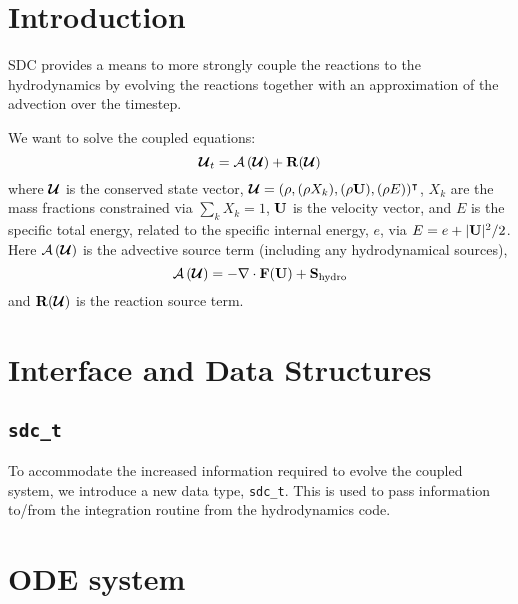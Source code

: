 \section{Introduction}

SDC provides a means to more strongly couple the reactions to the
hydrodynamics by evolving the reactions together with an approximation
of the advection over the timestep.

We want to solve the coupled equations:
\begin{equation}
{\bm{\mathcal{U}}}_t = {\mathcal{A} \left({\bm{\mathcal{U}}}\right)} + {\bf R}({\bm{\mathcal{U}}})
\end{equation}
where ${\bm{\mathcal{U}}}$ is the conserved state vector, ${\bm{\mathcal{U}}} = (\rho, (\rho X_k),
(\rho {\bf U}), (\rho E))^\intercal$, $X_k$ are the mass fractions
constrained via $\sum_k X_k = 1$, ${\bf U}$ is the velocity vector, and
$E$ is the specific total energy, related to the specific internal
energy, $e$, via $E = e + |{\bf U}|^2/2$.  Here ${\mathcal{A} \left({\bm{\mathcal{U}}}\right)}$ is the
advective source term (including any hydrodynamical sources),
\begin{equation}
{\mathcal{A} \left({\bm{\mathcal{U}}}\right)} = - \nabla \cdot \mathbf{F}({\bf U}) + {\bf S}_\mathrm{hydro}
\end{equation}
and ${\bf R}({\bm{\mathcal{U}}})$
is the reaction source term.


\section{Interface and Data Structures}

\subsection{\tt sdc\_t}

To accommodate the increased information required to evolve the
coupled system, we introduce a new data type, {\tt sdc\_t}.  This is
used to pass information to/from the integration routine from the
hydrodynamics code.


\section{ODE system}


